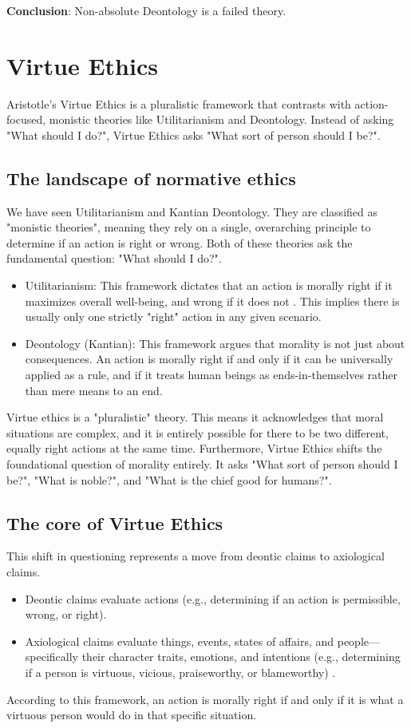 \documentclass[12pt]{article}
\begin{document}
\noindent\textbf{Conclusion}: Non-absolute Deontology is a failed theory.

\newpage

\section{Virtue Ethics}
Aristotle's Virtue Ethics is a pluralistic framework that contrasts with action-focused, monistic theories like Utilitarianism and Deontology. Instead of asking "What should I do?", Virtue Ethics asks "What sort of person should I be?".
\subsection{The landscape of normative ethics}
We have seen Utilitarianism and Kantian Deontology. They are classified as "monistic theories",
meaning they rely on a single, overarching principle to determine if an action is right or wrong. Both of these theories ask the fundamental question: "What should I do?".
\begin{itemize}
    \item Utilitarianism: This framework dictates that an action is morally right if it maximizes overall well-being, and wrong if it does not . This implies there is usually only one strictly "right" action in any given scenario.
    \item Deontology (Kantian): This framework argues that morality is not just about consequences. An action is morally right if and only if it can be universally applied as a rule, and if it treats human beings as ends-in-themselves rather than mere means to an end.
\end{itemize}
Virtue ethics is a "pluralistic" theory. This means it acknowledges that moral situations are complex, and it is entirely possible for there to be two different, equally right actions at the same time. Furthermore, Virtue Ethics shifts the foundational question of morality entirely.
It asks "What sort of person should I be?", "What is noble?", and "What is the chief good for humans?".
\subsection{The core of Virtue Ethics}
This shift in questioning represents a move from deontic claims to axiological claims.
\begin{itemize}
    \item Deontic claims evaluate actions (e.g., determining if an action is permissible, wrong, or right).
    \item Axiological claims evaluate things, events, states of affairs, and people—specifically their character traits, emotions, and intentions (e.g., determining if a person is virtuous, vicious, praiseworthy, or blameworthy) .
\end{itemize}
According to this framework, an action is morally right if and only if it is what a virtuous person would do in that specific situation.
\end{document}
